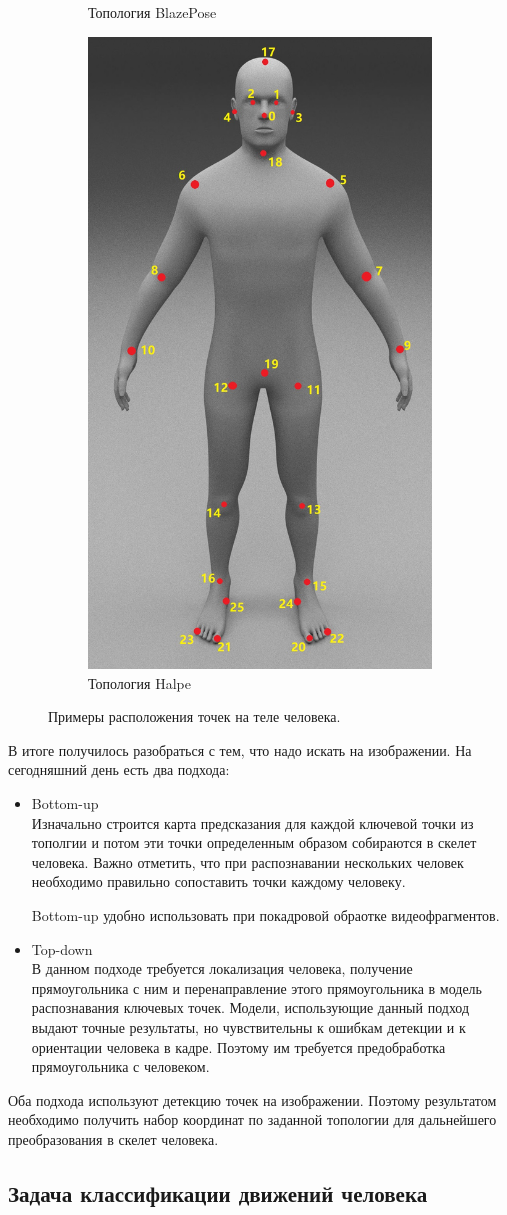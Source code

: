 \begin{figure}[h]
\begin{subfigure}[b]{.3\textwidth}
    \caption{Топология BlazePose }
    \label{fig:BlazePose_topology}
\end{subfigure}
\begin{subfigure}[b]{.3\textwidth}
	\centering
    \includegraphics[height=\textwidth]{./images/Halpe_topology.jpg}
    \caption{Топология Halpe}
    \label{fig:Halpe_topology}
\end{subfigure}
    \caption{Примеры расположения точек на теле человека.}
\end{figure}

В итоге получилось разобраться с тем, что надо искать на изображении. На сегодняшний день есть два подхода:

\begin{itemize}
	\item Bottom-up\\
	Изначально строится карта предсказания для каждой ключевой точки из тополгии и потом эти точки определенным образом собираются в скелет человека. Важно отметить, что при распознавании нескольких человек необходимо правильно сопоставить точки каждому человеку.
	
	Bottom-up удобно использовать при покадровой обраотке видеофрагментов. 
	\item Top-down\\
	В данном подходе требуется локализация человека, получение прямоугольника с ним и перенаправление этого прямоугольника в модель распознавания ключевых точек.
	Модели, использующие данный подход выдают точные результаты, но чувствительны к ошибкам детекции и к ориентации человека в кадре. Поэтому им требуется предобработка прямоугольника с человеком.
\end{itemize}

Оба подхода используют детекцию точек на изображении. Поэтому результатом необходимо получить набор координат по заданной топологии для дальнейшего преобразования в скелет человека.

\subsection{Задача классификации движений человека}
\label{subsec:Theory of classification}




\newpage